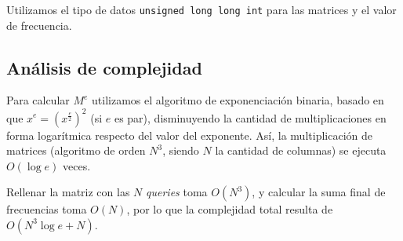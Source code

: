 Utilizamos el tipo de datos {\tt unsigned long long int} para las matrices y
el valor de frecuencia.


\subsection*{Análisis de complejidad}

Para calcular $M^e$ utilizamos el algoritmo de exponenciación binaria, basado en
que $x^e = (x^\frac e 2)^2$ (si $e$ es par), disminuyendo la cantidad de
multiplicaciones en forma logarítmica respecto del valor del exponente. Así, la
multiplicación de matrices (algoritmo de orden $N^3$, siendo $N$
la cantidad de columnas) se ejecuta $O(\log e)$ veces.

Rellenar la matriz con las $N$ {\sl queries} toma $O(N^3)$, y calcular la suma
final de frecuencias toma $O(N)$, por lo que la complejidad total resulta de
$O(N^3\log e + N)$.
